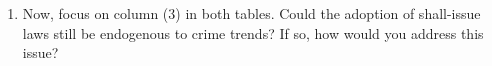 \documentclass{article}
\begin{document}
\begin{enumerate}
{}\\[1em]



    \item Now, focus on column (3) in both tables. Could the adoption of shall-issue laws still be endogenous to crime trends? If so, how would you address this issue?\\[1em]
\\[1em]


\end{enumerate}
\end{document}
